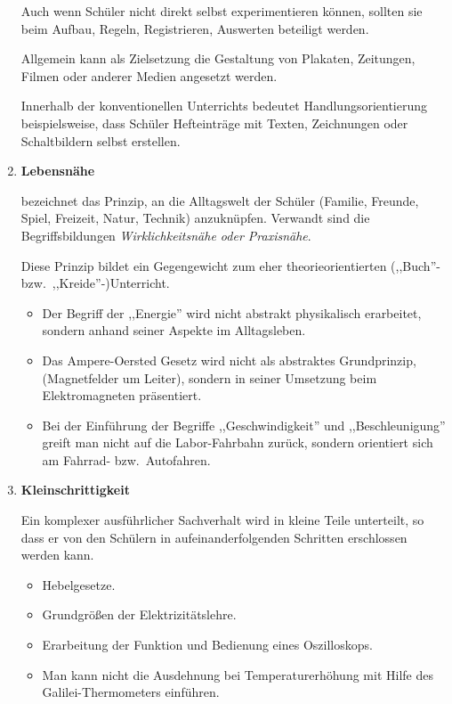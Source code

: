 \begin{enumerate}
	\mip
	Auch wenn Sch\"{u}ler nicht direkt selbst experimentieren
	k\"{o}nnen, sollten sie beim Aufbau, Regeln, Registrieren, Auswerten
	beteiligt werden.
	
	\mip
	Allgemein kann als Zielsetzung die Gestaltung von
	Plakaten, Zeitungen,
	Filmen oder anderer Medien angesetzt werden.
	
	\mip
	Innerhalb der konventionellen Unterrichts bedeutet
	Handlungsorientierung
	beispielsweise, dass Sch\"{u}ler
	Hefteintr\"{a}ge mit Texten, Zeichnungen
	oder Schaltbildern selbst erstellen.
	
	\item{\textbf{Lebensn\"{a}he}}
	
	bezeichnet das Prinzip, an die Alltagswelt der Sch\"{u}ler (Familie, Freunde, Spiel, Freizeit, Natur,
	Technik) anzukn\"{u}pfen. Verwandt sind die Begriffsbildungen
	{\it Wirklichkeitsn\"{a}he oder Praxisn\"{a}he}.
	
	Diese Prinzip bildet ein Gegengewicht zum eher theorieorientierten
	(,,Buch''- bzw.\ ,,Kreide''-)Unterricht.
	\begin{beisp}
		\begin{itemize}
		\item
		Der Begriff der ,,Energie'' wird nicht abstrakt physikalisch
		erarbeitet, sondern anhand seiner Aspekte im Alltagsleben.
		\item
		Das Ampere-Oersted Gesetz wird nicht als abstraktes Grundprinzip,
		(Magnetfelder um Leiter), sondern in seiner Umsetzung
		beim Elektromagneten pr\"{a}sentiert.
		\item
		Bei der Einf\"{u}hrung der Begriffe ,,Geschwindigkeit'' und
		,,Beschleunigung'' greift man nicht auf die Labor-Fahrbahn
		zur\"{u}ck, sondern orientiert sich am Fahrrad- bzw.\ Autofahren.
		\end{itemize}
	\end{beisp}
	
	
	\item{\textbf{Kleinschrittigkeit}}
	
	Ein komplexer ausf\"{u}hrlicher Sachverhalt wird
	in kleine Teile unterteilt, so dass er von den Sch\"{u}lern
	in aufeinanderfolgenden Schritten erschlossen werden kann.
	
	\begin{beisp}
		\begin{itemize}
		\item Hebelgesetze.
		\item Grundgr\"{o}{\ss}en der Elektrizit\"{a}tslehre.
		\item Erarbeitung der Funktion und Bedienung eines Oszilloskops.
		\item Man kann nicht die Ausdehnung bei
		Temperaturerh\"{o}hung mit Hilfe des Galilei-Thermometers einf\"{u}hren.
		\end{itemize}
	\end{beisp}
	

\end{enumerate}
